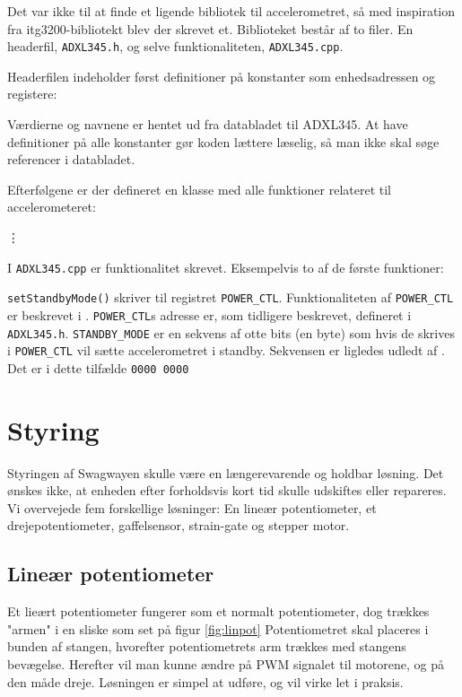 \documentclass[a4paper,oneside,article,danish,table]{memoir}
\newcommand{\adxlh}[2]{}
\newcommand{\adxlc}[2]{}
\begin{document}
Det var ikke til at finde et ligende bibliotek til accelerometret, så med inspiration fra itg3200-bibliotekt blev der skrevet et. Biblioteket består af to filer. En headerfil, \texttt{ADXL345.h}, og selve funktionaliteten, \texttt{ADXL345.cpp}.

Headerfilen indeholder først definitioner på konstanter som enhedsadressen og registere:
\adxlh{23}{35}
Værdierne og navnene er hentet ud fra databladet til ADXL345. \cite{adxl345} At have definitioner på alle konstanter gør koden lættere læselig, så man ikke skal søge referencer i databladet.

Efterfølgene er der defineret en klasse med alle funktioner relateret til accelerometeret:
\adxlh{37}{49}
\begin{center}
  \vdots
\end{center}

I \texttt{ADXL345.cpp} er funktionalitet skrevet. Eksempelvis to af de første funktioner:
\adxlc{28}{36}
\lstinline{setStandbyMode()} skriver til registret \lstinline{POWER_CTL}. Funktionaliteten af \lstinline{POWER_CTL} er beskrevet i \cite{ADXL345}. \lstinline{POWER_CTL}s adresse er, som tidligere beskrevet, defineret i \texttt{ADXL345.h}. \lstinline{STANDBY_MODE} er en sekvens af otte bits (en byte) som hvis de skrives i \lstinline{POWER_CTL} vil sætte accelerometret i standby. Sekvensen er ligledes udledt af \cite{ADXL345}. Det er i dette tilfælde \texttt{0000\,0000}

\section{Styring}
Styringen af Swagwayen skulle være en længerevarende og holdbar løsning. Det ønskes ikke, at enheden efter forholdsvis kort tid skulle udskiftes eller repareres. Vi overvejede fem forskellige løsninger: En lineær potentiometer, et drejepotentiometer, gaffelsensor, strain-gate og stepper motor.
\subsection{Lineær potentiometer} 
Et lieært potentiometer fungerer som et normalt potentiometer, dog trækkes "armen" i en sliske som set på figur \ref{fig:linpot}
Potentiometret skal placeres i bunden af stangen, hvorefter potentiometrets arm trækkes med stangens bevægelse. Herefter vil man kunne ændre på PWM signalet til motorene, og på den måde dreje. Løsningen er simpel at udføre, og vil virke let i praksis.
\end{document}
